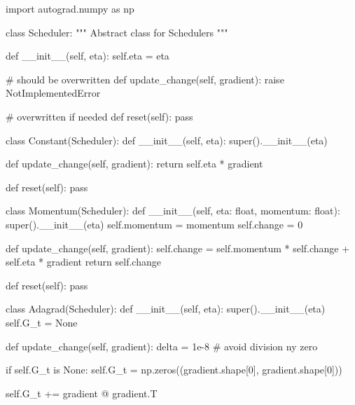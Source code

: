 \documentclass[%
oneside,                 %
final,                   %
10pt]{article}
\begin{document}
\bpycod
import autograd.numpy as np

class Scheduler:
    """
    Abstract class for Schedulers
    """

    def __init__(self, eta):
        self.eta = eta

    # should be overwritten
    def update_change(self, gradient):
        raise NotImplementedError

    # overwritten if needed
    def reset(self):
        pass


class Constant(Scheduler):
    def __init__(self, eta):
        super().__init__(eta)

    def update_change(self, gradient):
        return self.eta * gradient
    
    def reset(self):
        pass


class Momentum(Scheduler):
    def __init__(self, eta: float, momentum: float):
        super().__init__(eta)
        self.momentum = momentum
        self.change = 0

    def update_change(self, gradient):
        self.change = self.momentum * self.change + self.eta * gradient
        return self.change

    def reset(self):
        pass


class Adagrad(Scheduler):
    def __init__(self, eta):
        super().__init__(eta)
        self.G_t = None

    def update_change(self, gradient):
        delta = 1e-8  # avoid division ny zero

        if self.G_t is None:
            self.G_t = np.zeros((gradient.shape[0], gradient.shape[0]))

        self.G_t += gradient @ gradient.T
\end{document}
